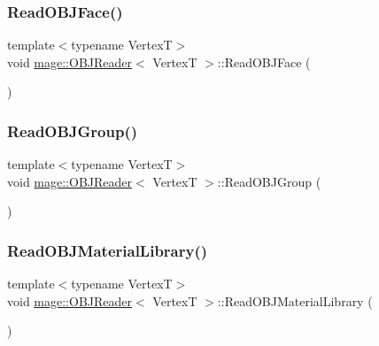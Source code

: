 \subsubsection{\texorpdfstring{Read\+O\+B\+J\+Face()}{ReadOBJFace()}}
{\footnotesize\ttfamily template$<$typename VertexT$>$ \\
void \hyperlink{classmage_1_1_o_b_j_reader}{mage\+::\+O\+B\+J\+Reader}$<$ VertexT $>$\+::Read\+O\+B\+J\+Face (\begin{DoxyParamCaption}{ }\end{DoxyParamCaption})\hspace{0.3cm}{\ttfamily [private]}}

\hypertarget{classmage_1_1_o_b_j_reader_a8159620b12d426073581202fee022662}{}\label{classmage_1_1_o_b_j_reader_a8159620b12d426073581202fee022662} 
\subsubsection{\texorpdfstring{Read\+O\+B\+J\+Group()}{ReadOBJGroup()}}
{\footnotesize\ttfamily template$<$typename VertexT$>$ \\
void \hyperlink{classmage_1_1_o_b_j_reader}{mage\+::\+O\+B\+J\+Reader}$<$ VertexT $>$\+::Read\+O\+B\+J\+Group (\begin{DoxyParamCaption}{ }\end{DoxyParamCaption})\hspace{0.3cm}{\ttfamily [private]}}

\hypertarget{classmage_1_1_o_b_j_reader_abc1f67436e50230bd2071b2dc31a4689}{}\label{classmage_1_1_o_b_j_reader_abc1f67436e50230bd2071b2dc31a4689} 
\subsubsection{\texorpdfstring{Read\+O\+B\+J\+Material\+Library()}{ReadOBJMaterialLibrary()}}
{\footnotesize\ttfamily template$<$typename VertexT$>$ \\
void \hyperlink{classmage_1_1_o_b_j_reader}{mage\+::\+O\+B\+J\+Reader}$<$ VertexT $>$\+::Read\+O\+B\+J\+Material\+Library (\begin{DoxyParamCaption}{ }\end{DoxyParamCaption})\hspace{0.3cm}{\ttfamily [private]}}

